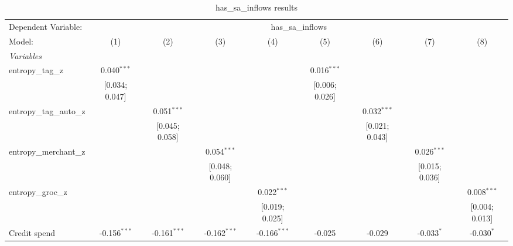 
\begin{table}[htbp]
   \centering
   \tiny
   \begin{threeparttable}[b]
      \caption{\label{tab:reg_has_sa_inflows_full} has\_sa\_inflows results}
      \begin{tabular}{lcccccccc}
         \tabularnewline \midrule \midrule
         Dependent Variable: & \multicolumn{8}{c}{has\_sa\_inflows}\\
         Model:                   & (1)              & (2)               & (3)              & (4)              & (5)             & (6)             & (7)             & (8)\\  
         \midrule
         \emph{Variables}\\
         entropy\_tag\_z          & 0.040$^{***}$    &                   &                  &                  & 0.016$^{***}$   &                 &                 &   \\   
                                  & [0.034; 0.047]   &                   &                  &                  & [0.006; 0.026]  &                 &                 &   \\   
         entropy\_tag\_auto\_z    &                  & 0.051$^{***}$     &                  &                  &                 & 0.032$^{***}$   &                 &   \\   
                                  &                  & [0.045; 0.058]    &                  &                  &                 & [0.021; 0.043]  &                 &   \\   
         entropy\_merchant\_z     &                  &                   & 0.054$^{***}$    &                  &                 &                 & 0.026$^{***}$   &   \\   
                                  &                  &                   & [0.048; 0.060]   &                  &                 &                 & [0.015; 0.036]  &   \\   
         entropy\_groc\_z         &                  &                   &                  & 0.022$^{***}$    &                 &                 &                 & 0.008$^{***}$\\   
                                  &                  &                   &                  & [0.019; 0.025]   &                 &                 &                 & [0.004; 0.013]\\   
         Credit spend             & -0.156$^{***}$   & -0.161$^{***}$    & -0.162$^{***}$   & -0.166$^{***}$   & -0.025          & -0.029          & -0.033$^{*}$    & -0.030$^{*}$\\   

\end{tabular}
\end{threeparttable}
\end{table}

